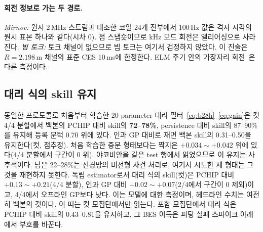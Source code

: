 \documentclass[10pt,twocolumn,letterpaper]{article}
\newcommand{\Ti}{\ensuremath{T_i}}
\newcommand{\skillp}{\ensuremath{\mathrm{skill}_{\mathrm{PCHIP}}}}
\begin{document}
\begin{table}[t]
  \centering
  \caption{윈도 대조군의 평가 시점 입력 민감도(재학습 없음): \Ti{}의 $\skillp$(4분할
  평균)와 전체 모델 대비 짝지은 변화($^{*}$ = 유의한 분할). 0으로 만든 입력은 대조군에게
  분포 밖이므로, 각 행은 그룹의 기여가 아니라 민감도를 잰다.}
  \label{tab:ablation}
  \footnotesize
  \setlength{\tabcolsep}{2.5pt}
\end{table}

\paragraph{회전 정보로 가는 두 경로.} \emph{Mirnov:} 원시 2\,MHz 스트림과 대조한
코일 24개 전부에서 100\,Hz 값은 격자 시각의 원시 표본 하나와 같다(시차 0). 점 스냅숏이므로
kHz 모드 회전은 앨리어싱으로 사라진다. \emph{빔 토크:}
토크 채널이 없으므로 빔 토크는 여기서 검정하지 않았다. 이 진술은 $R = 2.198$\,m 채널의
표준 CES 10\,ms에 한정한다. ELM 주기 안의 가장자리 회전~\citep{Viezzer2020Dynamics}은
다른 측정이다.

\subsection{대리 식의 skill 유지}
\label{sec:res:eq}
동일한 프로토콜로 처음부터 학습한 20-parameter 대리 필터~\eqref{eq:b28h}--\eqref{eq:gain}은
컷 4/4 분할에서 백본의 PCHIP 대비 skill의 \textbf{72--78\%}, persistence 대비 skill의
87--90\%를 유지해 등록 문턱 0.70 위에 있다. 인과 GP 대비로 재면 백본 skill의
0.31--0.50을 유지한다(컷, 점추정). 처음 학습한 증분 형태보다는 짝지은
$+0.034\sim+0.042$ 위에 있다(4/4 분할에서 구간이 0 위). 야코비안을 같은 test 행에서 읽었으므로
이 유지는 사후적이다. 남은 22--28\%는 신경망의 비선형 사건 처리로, 여기서 시도한 세 형태는
그것을 재현하지 못한다. 독립 estimator로서 대리 식의 skill(컷)은 PCHIP 대비
$+0.13\sim+0.21$(4/4 분할), 인과 GP 대비 $+0.02\sim+0.07$(2/4에서 구간이 0 제외)이고, 4/4에서
오프라인 GP보다 낮다. 이는 모델에 대한 측정이며, 헤드라인 수치는 여전히 백본의 것이다. 이 띠는 컷 모집단에서만 읽는다. 포함 모집단에서 대리 식은
PCHIP 대비 skill의 0.43--0.81을 유지하고, 그 BES 이득은 피팅 실패 스파이크 아래에서 부호를
바꾼다.
\end{document}
